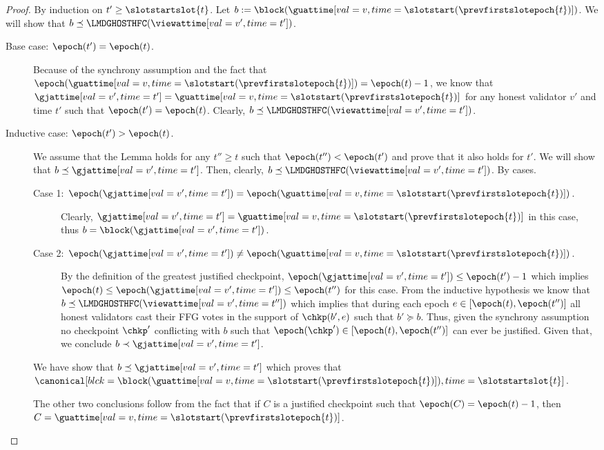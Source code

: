 \documentclass{article}
\begin{document}
\begin{proof}
    By induction on $t' \geq \slotstartslot{t}$.
    Let $b := \block(\guattime[val=v,time=\slotstart(\prevfirstslotepoch{t})])$.
    We will show that $b \preceq \LMDGHOSTHFC(\viewattime[val=v',time=t'])$.
    \begin{description}
        \item[Base case: {$\epoch(t') = \epoch(t)$}.] Because of the synchrony assumption and the fact that $\epoch(\guattime[val=v,time=\slotstart(\prevfirstslotepoch{t})]) = \epoch(t)-1$,
        we know that $\gjattime[val=v',time=t'] = \guattime[val=v,time=\slotstart(\prevfirstslotepoch{t})]$ for any honest validator $v'$ and time $t'$ such that $\epoch(t') = \epoch(t)$.
        Clearly, $b \preceq \LMDGHOSTHFC(\viewattime[val=v',time=t'])$.
        \item[Inductive case: {$\epoch(t') > \epoch(t)$}.] We assume that the Lemma holds for any $t'' \geq t$ such that $\epoch(t'') < \epoch(t')$ and prove that it also holds for $t'$.        
        We will show that $b \preceq \gjattime[val=v',time=t']$. Then, clearly, $b \preceq \LMDGHOSTHFC(\viewattime[val=v',time=t'])$.
        By cases.
        \begin{description}
            \item[Case 1: {$\epoch(\gjattime[val=v',time=t']) = \epoch(\guattime[val=v,time=\slotstart(\prevfirstslotepoch{t})])$}.] Clearly, $\gjattime[val=v',time=t'] = \guattime[val=v,time=\slotstart(\prevfirstslotepoch{t})]$ in this case, thus $b = \block(\gjattime[val=v',time=t'])$.
            \item[Case 2: {$\epoch(\gjattime[val=v',time=t']) \neq \epoch(\guattime[val=v,time=\slotstart(\prevfirstslotepoch{t})])$}.]
            By the definition of the greatest justified checkpoint, $\epoch(\gjattime[val=v',time=t']) \leq \epoch(t')-1$ which implies $\epoch(t) \leq \epoch(\gjattime[val=v',time=t']) \leq \epoch(t'')$ for this case.
            From the inductive hypothesis we know that $b \preceq \LMDGHOSTHFC(\viewattime[val=v',time=t''])$ which implies that during each epoch $e \in \left[\epoch(t), \epoch(t'')\right]$ all honest validators cast their FFG votes in the support of $\chkp(b',e)$ such that $b' \succeq b$.
            Thus, given the synchrony assumption no checkpoint $\chkp'$ conflicting with $b$ such that $\epoch(\chkp') \in \left[\epoch(t), \epoch(t'')\right]$ can ever be justified.
            Given that, we conclude $b \prec \gjattime[val=v',time=t']$.
        \end{description}
        We have show that $b \preceq \gjattime[val=v',time=t']$ which proves that $\canonical[blck={\block(\guattime[val=v,time=\slotstart(\prevfirstslotepoch{t})])},time=\slotstartslot{t}]$.

        The other two conclusions follow from the fact that if $C$ is a justified checkpoint such that $\epoch(C) = \epoch(t)-1$, then $C = \guattime[val=v,time=\slotstart(\prevfirstslotepoch{t})]$.
    \end{description}
\end{proof}
\end{document}
